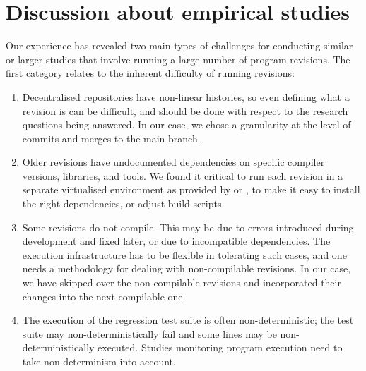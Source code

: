 \section{Discussion about empirical studies}
\label{evolution:discussion}


Our experience has revealed two main types of challenges for conducting similar
or larger studies that involve running a large number of program revisions. The
first category relates to the inherent difficulty of running revisions:

\begin{enumerate}
\item Decentralised repositories have non-linear histories, so even
  defining what a revision is can be difficult, and should be done
  with respect to the research questions being answered.  In our case,
  we chose a granularity at the level of commits and merges to the
  main branch.

\item Older revisions have undocumented dependencies on specific
  compiler versions, libraries, and tools.  We found it critical to run each
  revision in a separate virtualised environment as provided by \lxc or
  \docker, to make it easy to install the right dependencies, or adjust build
  scripts.

\item Some revisions do not compile.  This may be due to errors
  introduced during development and fixed later, or due to incompatible
  dependencies. The execution infrastructure has to be
  flexible in tolerating such cases, and one needs a methodology for
  dealing with non-compilable revisions.  In our case, we have skipped
  over the non-compilable revisions and incorporated their changes into
  the next compilable one.

\item The execution of the regression test suite is often
  non-deterministic; the test suite may non-deterministically fail
  and some lines may be non-deterministically executed. Studies
  monitoring program execution need to take non-determinism
  into account.
\end{enumerate}

